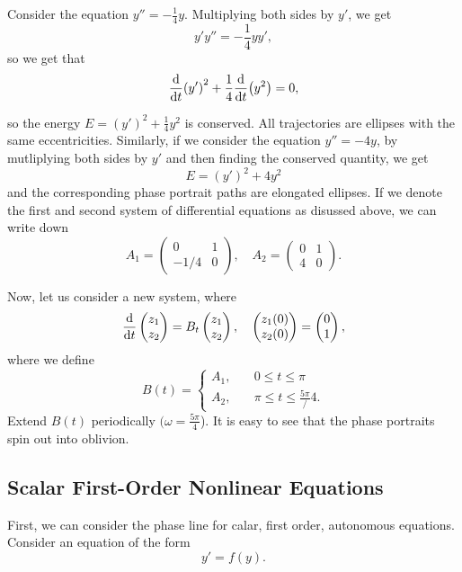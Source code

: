 \documentclass{article}
\begin{document}
\begin{example}
    Consider the equation $y'' = -\frac{1}{4} y$. Multiplying both sides by $y'$, we get 
    \[
        y'y'' = -\frac{1}{4} yy', 
    \]
    so we get that 
    \[
        \dv{t} (y')^2 + \frac{1}{4} \dv{t}(y^2) = 0,
    \]

    so the energy $E = (y')^2 + \frac{1}{4} y^2$ is conserved. All trajectories are ellipses with the same eccentricities. Similarly, if we consider the equation $y'' = -4 y$, by mutliplying both sides by $y'$ and then finding the conserved quantity, we get 
    \[
        E = (y')^2 + 4y^2
    \]
    and the corresponding phase portrait paths are elongated ellipses. If we denote the first and second system of differential equations as disussed above, we can write down 
    \[
        A_1 = \begin{pmatrix}
        0 & 1 \\ -1/4 & 0 
        \end{pmatrix}, \quad A_2 = \begin{pmatrix}
        0 & 1 \\ 4 & 0 
        \end{pmatrix}.
    \]  

    Now, let us consider a new system, where 
    \[
        \dv{t} \begin{pmatrix} z_1 \\ z_2 \end{pmatrix} = B_t \begin{pmatrix} z_1 \\ z_2 \end{pmatrix}, \quad \begin{pmatrix} z_1(0) \\ z_2(0) \end{pmatrix} = \begin{pmatrix} 0 \\ 1 \end{pmatrix},
    \]
    where we define 
    \[
        B(t) = \begin{cases}
        A_1, \quad& 0 \leq t \leq \pi \\
        A_2, \quad& \pi \leq t \leq \frac{5\pi}/4.
        \end{cases}
    \]
    Extend $B(t)$ periodically $(\omega = \frac{5\pi}{4}$). It is easy to see that the phase portraits spin out into oblivion. 
\end{example}

\subsection*{Scalar First-Order Nonlinear Equations}
First, we can consider the phase line for calar, first order, autonomous equations. Consider an equation of the form 
\[
    y' = f(y).
\]
\end{document}
